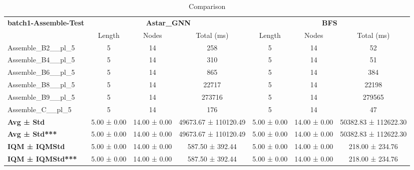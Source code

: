 \begin{table}[!ht]
\centering
\small
\begin{tabular}{l|ccc|ccc}
\multirow{2}{*}{\textbf{batch1-Assemble-Test}} & \multicolumn{3}{c|}{\textbf{Astar\_GNN}} & \multicolumn{3}{c}{\textbf{BFS}} \\
\cline{2-7}
& Length & Nodes & Total (ms) & Length & Nodes & Total (ms) \\
\hline
Assemble\_B2\_\_pl\_5 & 5 & 14 & 258 & 5 & 14 & 52 \\
Assemble\_B4\_\_pl\_5 & 5 & 14 & 310 & 5 & 14 & 51 \\
Assemble\_B6\_\_pl\_5 & 5 & 14 & 865 & 5 & 14 & 384 \\
Assemble\_B8\_\_pl\_5 & 5 & 14 & 22717 & 5 & 14 & 22198 \\
Assemble\_B9\_\_pl\_5 & 5 & 14 & 273716 & 5 & 14 & 279565 \\
Assemble\_C\_\_pl\_5 & 5 & 14 & 176 & 5 & 14 & 47 \\
\hline
\textbf{Avg ± Std} & 5.00 ± 0.00 & 14.00 ± 0.00 & 49673.67 ± 110120.49 & 5.00 ± 0.00 & 14.00 ± 0.00 & 50382.83 ± 112622.30 \\
\textbf{Avg ± Std***} & 5.00 ± 0.00 & 14.00 ± 0.00 & 49673.67 ± 110120.49 & 5.00 ± 0.00 & 14.00 ± 0.00 & 50382.83 ± 112622.30 \\
\textbf{IQM ± IQMStd} & 5.00 ± 0.00 & 14.00 ± 0.00 & 587.50 ± 392.44 & 5.00 ± 0.00 & 14.00 ± 0.00 & 218.00 ± 234.76 \\
\textbf{IQM ± IQMStd***} & 5.00 ± 0.00 & 14.00 ± 0.00 & 587.50 ± 392.44 & 5.00 ± 0.00 & 14.00 ± 0.00 & 218.00 ± 234.76 \\
\end{tabular}
\caption{Comparison}
\label{tab:batch1_Assemble_comparison_test}
\end{table}
